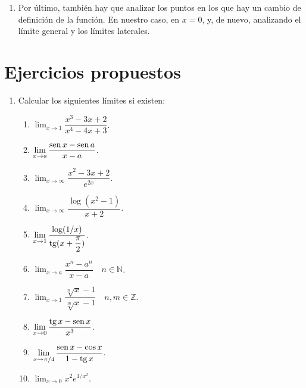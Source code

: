 \begin{enumerate}[leftmargin=*]
\begin{indicacion}
{\begin{enumerate}
\item Por último, también hay que analizar los puntos en los que hay
un cambio de definición de la función. En nuestro caso, en $x=0$, y,
de nuevo, analizando el límite general y los límites laterales.

\end{enumerate}

}
\end{indicacion}

\end{enumerate}


\section{Ejercicios propuestos}

\begin{enumerate}[leftmargin=*]
\item  Calcular los siguientes límites si existen:
\begin{multicols}{2}
\begin{enumerate}
    \item  $\displaystyle \lim_{x\rightarrow 1}\dfrac{x^3-3x+2}{x^4-4x+3}$.

    \item  $\displaystyle \lim_{x\rightarrow a}\dfrac{\mathop{\rm sen}\nolimits x-\mathop{\rm sen}\nolimits a}{x-a}$.

    \item $\displaystyle \lim_{x\rightarrow\infty}\dfrac{x^2-3x+2}{e^{2x}}$.

    \item $\displaystyle \lim_{x\rightarrow\infty}\dfrac{\log(x^2-1)}{x+2}$.

    \item $\displaystyle \lim_{x\rightarrow 1}\dfrac{\log(1/x)}{\mathop{\rm tg}\nolimits(x+\dfrac{\pi}{2})}$.

    \item $\displaystyle \lim_{x\rightarrow a}\dfrac{x^n-a^n}{x-a}\quad n\in \mathbb{N}$.

    \item $ \displaystyle \lim_{x\rightarrow
    1}\dfrac{\sqrt[n]{x}-1}{\sqrt[m]{x}-1}\quad n,m \in \mathbb{Z}$.

    \item $\displaystyle \lim_{x\rightarrow 0}\dfrac{\mathop{\rm tg}\nolimits x-\mathop{\rm sen}\nolimits x}{x^3}$.

    \item $\displaystyle \lim_{x\rightarrow \pi/4}\dfrac{\mathop{\rm sen}\nolimits x-\cos x}{1-\mathop{\rm tg}\nolimits x}$.

    \item $\displaystyle \lim_{x\rightarrow 0}x^2e^{1/x^2}$.


\end{enumerate}
\end{multicols}
\end{enumerate}
